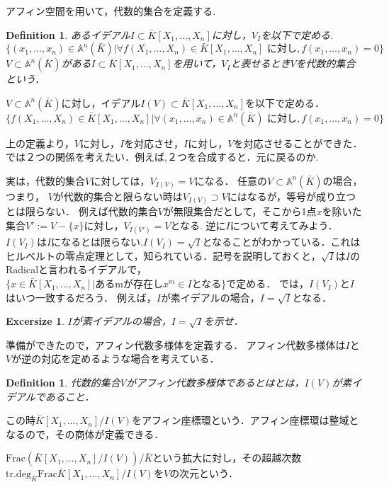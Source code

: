 \documentclass{ujarticle}
\newtheorem{dfn}[thm]{Definition}
\newtheorem{exs}[thm]{Excersize}
\begin{document}
アフィン空間を用いて，代数的集合を定義する.
\begin{dfn}
 あるイデアル$I \subset \bar{K}[X_1,\dots,X_n]$に対し，$V_I$を以下で定める.
\begin{equation*}
   \{ (x_1,\dots,x_n)  \in \mathbb{A}^n(\bar{K})|  \forall f(X_1,\dots,X_n) \in \bar{K}[X_1,\dots,X_n] \mbox{ に対し},f(x_1,\dots,x_n)=0 \}
\end{equation*}
$V \subset  \mathbb{A}^n(\bar{K}) $がある$I \subset \bar{K}[X_1,\dots,X_n]$を用いて，$V_I$と表せるとき$V$を代数的集合という．
\end{dfn}

$V \subset \mathbb{A}^n(\bar{K})$に対し，イデアル$I(V) \subset  \bar{K}[X_1,\dots,X_n]$を以下で定める．
\begin{equation*}
   \{ f(X_1,\dots,X_n)  \in \bar{K}[X_1,\dots,X_n]|  \forall (x_1,\dots,x_n) \in \mathbb{A}^n(\bar{K}) \mbox{ に対し},f(x_1,\dots,x_n)=0 \}
\end{equation*}

上の定義より，$V$に対し，$I$を対応させ，$I$に対し，$V$を対応させることができた．
では２つの関係を考えたい．例えば,２つを合成すると．元に戻るのか.

実は，代数的集合$V$に対しては，$V_{I(V)} =V$になる．
任意の$V \subset \mathbb{A}^n(\bar{K})$の場合，つまり，
$V$が代数的集合と限らない時は$V_{I(V)} \supset V$にはなるが，等号が成り立つとは限らない．
例えば代数的集合$V$が無限集合だとして，そこから1点$x$を除いた集合$V':=V-\{x\}$に対し，$V_{I(V')}=V$となる.
逆に$I$について考えてみよう．$I(V_I)$は$I$になるとは限らない.$I(V_I)=  \sqrt{I}$となることがわかっている．これはヒルベルトの零点定理として，知られている．記号を説明しておくと，$\sqrt{I}$は$I$のRadicalと言われるイデアルで，$\{ x \in \bar{K}[X_1,\dots,X_n] | \mbox{あるmが存在し} x^m \in I \mbox{となる}\}　$で定める．
では，$I(V_I)$と$I$はいつ一致するだろう． 例えば，$I$が素イデアルの場合，$I = \sqrt{I}$となる．

\begin{exs}
  $I$が素イデアルの場合，$I = \sqrt{I}$を示せ．
\end{exs}
準備ができたので，アフィン代数多様体を定義する．
アフィン代数多様体は$I$と$V$が逆の対応を定めるような場合を考えている．

\begin{dfn}
 代数的集合$V$がアフィン代数多様体であるとはとは，$I(V)$が素イデアルであること．
 \end{dfn}
 この時$ \bar{K}[X_1,\dots,X_n]/I(V)$をアフィン座標環という．アフィン座標環は整域となるので，その商体が定義できる．

$\mathrm{Frac}({\bar{K}[X_1,\dots,X_n]/I(V)})/\bar{K}$という拡大に対し，その超越次数$\mathrm{tr.deg}_{\bar{K}}\mathrm{Frac}{\bar{K}[X_1,\dots,X_n]/I(V)}$を$V$の次元という．
\end{document}
